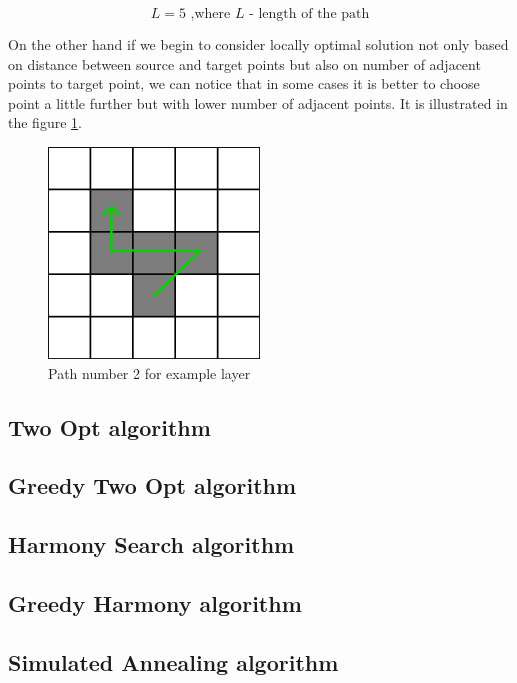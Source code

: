 \documentclass[titlepage]{article}
\begin{document}
\[ L = 5 \mbox{ ,where }L \mbox{ - length of the path}\]

On the other hand if we begin to consider locally optimal solution not only based on distance between source and target points but also on number of adjacent points to target point, we can notice that in some cases it is better to choose point a little further but with lower number of adjacent points. It is illustrated in the figure \ref{img:greedy/example-path-sol-2}.

\begin{figure}[H]
	\begin{center}
		\includegraphics[width=0.5\textwidth]{img/greedy/example-path-sol-2}
		\caption{Path number 2 for example layer}
		\label{img:greedy/example-path-sol-2}
	\end{center}
\end{figure}

\subsection{Two Opt algorithm}

\subsection{Greedy Two Opt algorithm}

\subsection{Harmony Search algorithm}

\subsection{Greedy Harmony algorithm}

\subsection{Simulated Annealing algorithm}
\end{document}
